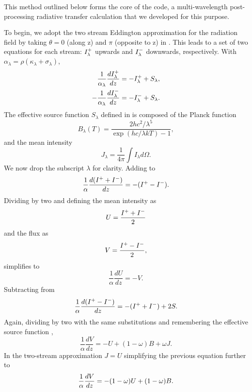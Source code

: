 This method outlined below forms the core of the \ocotillo code, a multi-wavelength post-processing radiative transfer calculation that we developed for this purpose.

\label{sec:Feautrier-method}

To begin, we adopt the two stream Eddington approximation for the radiation field by taking $\theta = 0$ (along z) and $\pi$ (opposite to z) in .
This leads to a set of two equations for each stream: $I^+_\lambda$ upwards and $I^-_\lambda$ downwards, respectively.
With $\alpha_\lambda = \rho(\kappa_\lambda + \sigma_\lambda)$,
\begin{align} 
    \frac{1}{\alpha_\lambda}\frac{dI^+_\lambda}{dz} &= -I^+_\lambda + S_\lambda \label{eqn:dIpdz}, \\
    -\frac{1}{\alpha_\lambda}\frac{dI^-_\lambda}{dz} &= -I^-_\lambda + S_\lambda. \label{eqn:dImdz}
\end{align}
The effective source function $S_\lambda$ defined in  is composed of the Planck function
\begin{equation}
    B_{\lambda}(T) = \frac{2hc^2/\lambda^5}{\exp(hc/\lambda k T) - 1},
\end{equation}
and the mean intensity
\begin{equation}
    J_\lambda = \frac{1}{4\pi}\int I_\lambda d\Omega.
\end{equation}
We now drop the subscript $\lambda$ for clarity.
Adding  to 
\begin{equation}\label{eqn:dIdz}
    \frac{1}{\alpha}\frac{d(I^+ + I^-)}{dz} = - (I^+ - I^-).
\end{equation}
Dividing by two and defining the mean intensity as 
\begin{equation}
    U = \frac{I^+ + I^-}{2}
\end{equation}
and the flux as
\begin{equation}
    V = \frac{I^+ - I^-}{2},
\end{equation}
 simplifies to
\begin{equation}\label{eqn:dUdz=-V}
    \frac{1}{\alpha}\frac{dU}{dz} = -V.
\end{equation}
Subtracting  from 
\begin{equation}
    \frac{1}{\alpha}\frac{d(I^+ - I^-)}{dz} = - (I^+ + I^-) + 2S.
\end{equation}
Again, dividing by two with the same substitutions and remembering the effective source function ,
\begin{equation}
    \frac{1}{\alpha}\frac{dV}{dz} = -U + (1-\omega) B + \omega J.
\end{equation}
In the two-stream approximation $J=U$ simplifying the previous equation further to
\begin{equation}
    \frac{1}{\alpha}\frac{dV}{dz} = -(1-\omega) U + (1-\omega) B. \\
\end{equation}

